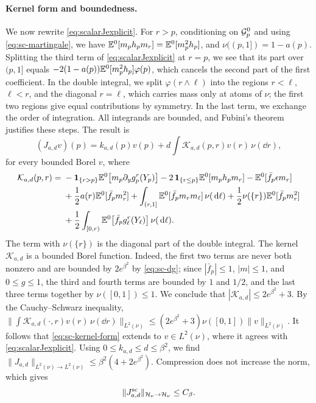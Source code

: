 \paragraph{Kernel form and boundedness.}
We now rewrite \eqref{eq:scalarJexplicit}. For $r>p$, conditioning on
$\mathcal G^0_p$ and using \eqref{eq:sc-martingale}, we have
$\mathbb E^0[m_ph_pm_r]=\mathbb E^0[m_p^2h_p]$, and $\nu((p,1])=1-a(p)$. Splitting the
third term of \eqref{eq:scalarJexplicit} at $r=p$, we see that its part
over $(p,1]$ equals $-2(1-a(p))\mathbb E^0[m_p^2h_p]\varphi(p)$, which cancels
the second part of the first coefficient. In the double integral, we
split $\varphi(r\wedge\ell)$ into the regions $r<\ell$, $\ell<r$, and the
diagonal $r=\ell$, which carries mass only at atoms of $\nu$; the first
two regions give equal contributions by symmetry. In the last term, we
exchange the order of integration. All integrands are bounded, and
Fubini's theorem justifies these steps. The result is
\begin{equation}\label{eq:sc-kernel-form}
 (J_{a,d}v)(p)=k_{a,d}(p)v(p)+d\int\mathcal K_{a,d}(p,r)v(r)\,\nu(\dd r),
\end{equation}
for every bounded Borel $v$, where
\begin{equation}\label{eq:sc-kernel}
 \begin{aligned}
 \mathcal K_{a,d}(p,r)={}&
 -\mathbf1_{\{r>p\}}\mathbb E^0\bigl[m_p\partial_yg_p^r(Y_p)\bigr]
 -2\,\mathbf1_{\{r\le p\}}\mathbb E^0[m_ph_pm_r]
 -\mathbb E^0[\bar f_p\epsilon m_r]\\
 &+\frac12a(r)\mathbb E^0[\bar f_pm_r^2]
 +\int_{(r,1]}\mathbb E^0[\bar f_pm_rm_\ell]\,\nu(\,\mathrm d\ell)
 +\frac12\nu(\{r\})\mathbb E^0[\bar f_pm_r^2]\\
 &+\frac12\int_{[0,r)}\mathbb E^0\bigl[\bar f_pg_\ell^r(Y_\ell)\bigr]\,\nu(\,\mathrm d\ell).
 \end{aligned}
\end{equation}
The term with $\nu(\{r\})$ is the diagonal part of the double integral.
The kernel $\mathcal K_{a,d}$ is a bounded Borel function. Indeed, the
first two terms are never both nonzero and are bounded by
$2e^{\beta^2}$ by \eqref{eq:sc-dg}; since $|\bar f_p|\le1$, $|m|\le1$, and $0\le g\le1$, the
third and fourth terms are bounded by $1$ and $1/2$, and the last three
terms together by $\nu([0,1])\le1$. We conclude that
$|\mathcal K_{a,d}|\le2e^{\beta^2}+3$. By the Cauchy--Schwarz
inequality,
$\|\int\mathcal K_{a,d}(\cdot,r)v(r)\,\nu(\dd r)\|_{L^2(\nu)}
\le(2e^{\beta^2}+3)\nu([0,1])\|v\|_{L^2(\nu)}$. It follows that
\eqref{eq:sc-kernel-form} extends to $v\in L^2(\nu)$, where it agrees
with \eqref{eq:scalarJexplicit}. Using $0\le k_{a,d}\le d\le\beta^2$,
we find $\|J_{a,d}\|_{L^2(\nu)\to L^2(\nu)}\le\beta^2(4+2e^{\beta^2})$.
Compression does not increase the norm, which gives
\begin{equation}\label{eq:sc-J-bounded}
 \|J^{\mathrm{sc}}_{a,d}\|_{\mathcal H_\nu\to\mathcal H_\nu}\le C_\beta .
\end{equation}

